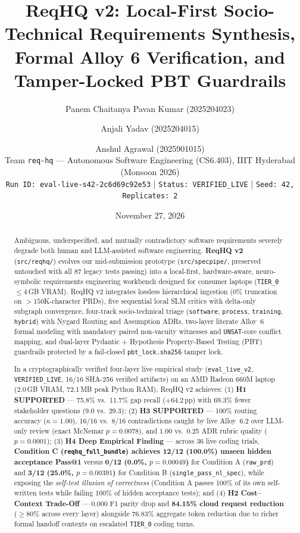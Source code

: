 \documentclass[11pt,a4paper]{article}
\title{\textbf{ReqHQ v2: Local-First Socio-Technical Requirements Synthesis,\\Formal Alloy 6 Verification, and Tamper-Locked PBT Guardrails}}
\author{
    Panem Chaitanya Pavan Kumar (2025204023) \and
    Anjali Yadav (2025204015) \and
    Anshul Agrawal (2025901015)\\[4pt]
    \small Team \texttt{req-hq} --- Autonomous Software Engineering (CS6.403), IIIT Hyderabad (Monsoon 2026)\\
    \small \texttt{Run ID: eval-live-s42-2c6d69c92e53} \;|\; \texttt{Status: VERIFIED\_LIVE} \;|\; \texttt{Seed: 42, Replicates: 2}
}
\date{November 27, 2026}
\begin{document}
\maketitle

\begin{abstract}
Ambiguous, underspecified, and mutually contradictory software requirements severely degrade both human and LLM-assisted software engineering. \textbf{ReqHQ v2} (\texttt{src/reqhq/}) evolves our mid-submission prototype (\texttt{src/specpipe/}, preserved untouched with all 87 legacy tests passing) into a local-first, hardware-aware, neuro-symbolic requirements engineering workbench designed for consumer laptops (\texttt{TIER\_0} $\le 4$\,GB VRAM). ReqHQ v2 integrates lossless hierarchical ingestion (0\% truncation on $>150$K-character PRDs), five sequential local SLM critics with delta-only subgraph convergence, four-track socio-technical triage (\texttt{software}, \texttt{process}, \texttt{training}, \texttt{hybrid}) with Nygard Routing and Assumption ADRs, two-layer literate Alloy~6 formal modeling with mandatory paired non-vacuity witnesses and \texttt{UNSAT}-core conflict mapping, and dual-layer Pydantic + Hypothesis Property-Based Testing (PBT) guardrails protected by a fail-closed \texttt{pbt\_lock.sha256} tamper lock.

In a cryptographically verified four-layer live empirical study (\texttt{eval\_live\_v2}, \texttt{VERIFIED\_LIVE}, 16/16 SHA-256 verified artifacts) on an AMD Radeon 660M laptop (2.0\,GB VRAM, 72.1\,MB peak Python RAM), ReqHQ v2 achieves: (1) \textbf{H1 SUPPORTED} --- 75.8\% vs.\ 11.7\% gap recall ($+64.2$\,pp) with 69.3\% fewer stakeholder questions (9.0 vs.\ 29.3); (2) \textbf{H3 SUPPORTED} --- 100\% routing accuracy ($\kappa = 1.00$), 16/16 vs.\ 8/16 contradictions caught by live Alloy~6.2 over LLM-only review (exact McNemar $p = 0.0078$), and 1.00 vs.\ 0.25 ADR rubric quality ($p = 0.0001$); (3) \textbf{H4 Deep Empirical Finding} --- across 36 live coding trials, \textbf{Condition C (\texttt{reqhq\_full\_bundle}) achieves 12/12 (100.0\%) unseen hidden acceptance Pass@1} versus \textbf{0/12 (0.0\%, $p = 0.00049$)} for Condition A (\texttt{raw\_prd}) and \textbf{3/12 (25.0\%, $p = 0.00391$)} for Condition B (\texttt{single\_pass\_nl\_spec}), while exposing the \emph{self-test illusion of correctness} (Condition A passes 100\% of its own self-written tests while failing 100\% of hidden acceptance tests); and (4) \textbf{H2 Cost--Context Trade-Off} --- 0.000 F1 parity drop and \textbf{84.15\% cloud request reduction} ($\ge 80\%$ across every layer) alongside 76.83\% aggregate token reduction due to richer formal handoff contexts on escalated \texttt{TIER\_0} coding turns.
\end{abstract}
\end{document}
